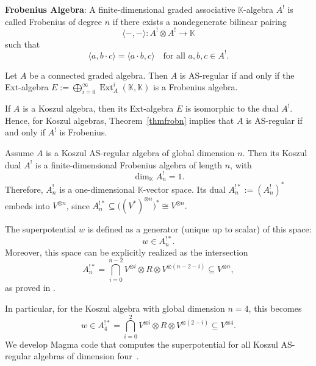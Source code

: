 \documentclass{amsart}
\DeclareMathOperator{\Ext}{Ext}
\begin{document}
\begin{definition}
\textbf{Frobenius Algebra}:
A finite-dimensional graded associative \(\mathbb{K}\)-algebra \(A^!\) is called Frobenius of degree \(n\) if there exists a nondegenerate bilinear pairing
\[
\langle -, - \rangle : A^! \otimes A^! \to \mathbb{K}
\]
such that
\[
\langle a, b \cdot c \rangle = \langle a \cdot b, c \rangle \quad \text{for all } a, b, c \in A^!.
\]
\end{definition}

\begin{theorem}{\cite[Corollary D]{lu2007koszul}}\label{thmfrobn}
Let \(A\) be a connected graded algebra. Then \(A\) is AS-regular if and only if the Ext-algebra \(E := \bigoplus_{i= 0}^{\infty} \Ext^i_A(\mathbb{K}, \mathbb{K})\) is a Frobenius algebra.
\end{theorem}

\begin{corollary}{\cite[Thm.~4.3 and Prop.~5.10]{MR1388568}}
If \(A\) is a Koszul algebra, then its Ext-algebra \(E\) is isomorphic to the dual \(A^!\). Hence, for Koszul algebras, Theorem~\ref{thmfrobn} implies that \(A\) is AS-regular if and only if \(A^!\) is Frobenius.
\end{corollary}

Assume \( A \) is a Koszul AS-regular algebra of global dimension \( n \). Then its Koszul dual \( A^{!} \) is a finite-dimensional Frobenius algebra of length \( n \), with \[
\dim_\mathbb{K} A^{!}_n = 1. \]
Therefore, \( A^{!}_n \) is a one-dimensional $\mathbb{K}$-vector space. Its dual $A_n^{!*} := (A_n^{!})^*$ embeds into \( V^{\otimes n} \), since $ A_n^{!*} \subseteq \big( (V^*)^{\otimes n} \big)^* \cong V^{\otimes n}.$

The superpotential \( w \) is defined as a generator (unique up to scalar) of this space:
\[
w \in A_n^{!*}.
\]
Moreover, this space can be explicitly realized as the intersection
\[
A_n^{!*} = \bigcap_{i=0}^{n - 2} V^{\otimes i} \otimes R \otimes V^{\otimes (n - 2 - i)} \subseteq V^{\otimes n},
\]
as proved in \cite[Lemma 2.11]{Mori_Izuru_Smith}.

In particular, for the Koszul algebra with global dimension \( n = 4 \), this becomes
$$ w \in A_4^{!*} = \bigcap_{i=0}^{2} V^{\otimes i} \otimes R \otimes V^{\otimes (2 - i)} \subseteq V^{\otimes 4}.$$
We develop Magma code that computes the superpotential for all Koszul AS-regular algebras of dimension four~\cite{vishal2025}. 
\end{document}
